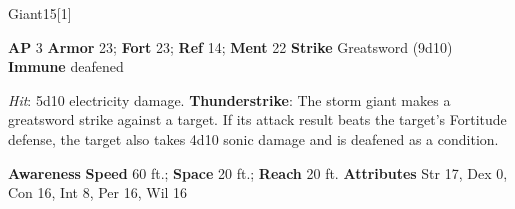 \begin{monsection}[Storm]{Giant}{15}[1]
\vspace{-1em}\vspace{-1em}
\begin{spellcontent}
\begin{spelltargetinginfo}
{\textbf{AP} 3}
\pari \textbf{Armor} 23;
\textbf{Fort} 23;
\textbf{Ref} 14;
\textbf{Ment} 22
\pari \textbf{Strike} Greatsword  (9d10)
\pari \textbf{Immune} deafened
\end{spelltargetinginfo}
\begin{spelleffects}
\pari
{}
\par
\par \textit{Hit}: 5d10 electricity damage.
\vspace{0.5em}
\pari
\textbf{Thunderstrike}:
The storm giant makes a greatsword strike against a target.
If its attack result beats the target's Fortitude defense,
the target also takes 4d10 sonic damage
and is deafened as a condition.
\end{spelleffects}
\end{spellcontent}
\begin{spellsubcontent}
\begin{spellfooter}
\pari \textbf{Awareness} 
\pari \textbf{Speed} 60 ft.;
\textbf{Space} 20 ft.;
\textbf{Reach} 20 ft.
\pari \textbf{Attributes}
Str 17,
Dex 0,
Con 16,
Int 8,
Per 16,
Wil 16
\end{spellfooter}
\end{spellsubcontent}
\end{monsection}
